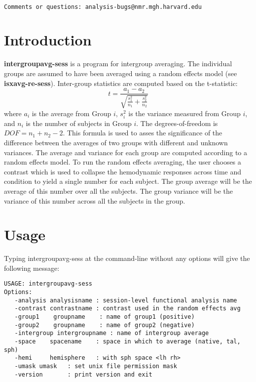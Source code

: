 \documentclass[10pt]{article}
\begin{document}
\begin{Large}
 \\
\end{Large}

\noindent 
\begin{verbatim}
Comments or questions: analysis-bugs@nmr.mgh.harvard.edu
\end{verbatim}

\section{Introduction}

{\bf intergroupavg-sess} is a program for intergroup averaging. The
individual groups are assumed to have been averaged using a random
effects model (see {\bf isxavg-re-sess}).  Inter-group statistics are
computed based on the t-statistic:
\begin{equation}
t = \frac{a_1 - a_2} { \sqrt{\frac{s_1^2}{n_1} + \frac{s_2^2}{n_2} }}
\label{igt.eqn}
\end{equation}
where $a_i$ is the average from Group $i$, $s_i^2$ is the variance
measured from Group $i$, and $n_i$ is the number of subjects in Group
$i$. The degrees-of-freedom is $DOF = n_1+n_2-2$.  This formula is
used to asses the significance of the difference between the averages
of two groups with different and unknown variances.  The average and
variance for each group are computed according to a random effects
model.  To run the random effects averaging, the user chooses a
contrast which is used to collapse the hemodynamic responses across
time and condition to yield a single number for each subject.  The
group average will be the average of this number over all the
subjects. The group variance will be the variance of this number
across all the subjects in the group.

\section{Usage}
Typing intergroupavg-sess at the command-line without any options will
give the following message:\\

\begin{small}
\begin{verbatim}
USAGE: intergroupavg-sess
Options:
   -analysis analysisname : session-level functional analysis name
   -contrast contrastname : contrast used in the random effects avg
   -group1    groupname    : name of group1 (positive)
   -group2    groupname    : name of group2 (negative)
   -intergroup intergroupname : name of intergroup average
   -space    spacename    : space in which to average (native, tal, sph)
   -hemi     hemisphere   : with sph space <lh rh>
   -umask umask   : set unix file permission mask
   -version       : print version and exit
\end{verbatim}
\end{small}
\end{document}
